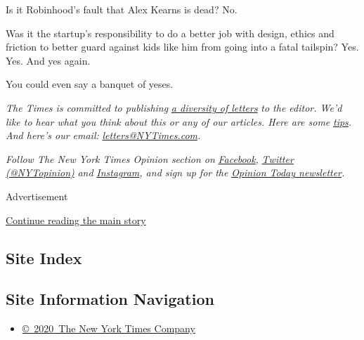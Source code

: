 Is it Robinhood's fault that Alex Kearns is dead? No.

Was it the startup's responsibility to do a better job with design,
ethics and friction to better guard against kids like him from going
into a fatal tailspin? Yes. Yes. And yes again.

You could even say a banquet of yeses.

\emph{The Times is committed to publishing}
\href{https://www.nytimes3xbfgragh.onion/2019/01/31/opinion/letters/letters-to-editor-new-york-times-women.html}{\emph{a
diversity of letters}} \emph{to the editor. We'd like to hear what you
think about this or any of our articles. Here are some}
\href{https://help.nytimes3xbfgragh.onion/hc/en-us/articles/115014925288-How-to-submit-a-letter-to-the-editor}{\emph{tips}}\emph{.
And here's our email:}
\href{mailto:letters@NYTimes.com}{\emph{letters@NYTimes.com}}\emph{.}

\emph{Follow The New York Times Opinion section on}
\href{https://www.facebookcorewwwi.onion/nytopinion}{\emph{Facebook}}\emph{,}
\href{http://twitter.com/NYTOpinion}{\emph{Twitter (@NYTopinion)}}
\emph{and}
\href{https://www.instagram.com/nytopinion/}{\emph{Instagram}}\emph{,
and sign up for the}
\href{http://www.nytimes3xbfgragh.onion/newsletters/opiniontoday/}{\emph{Opinion
Today newsletter}}\emph{.}

Advertisement

\protect\hyperlink{after-bottom}{Continue reading the main story}

\hypertarget{site-index}{%
\subsection{Site Index}\label{site-index}}

\hypertarget{site-information-navigation}{%
\subsection{Site Information
Navigation}\label{site-information-navigation}}

\begin{itemize}
\tightlist
\item
  \href{https://help.nytimes3xbfgragh.onion/hc/en-us/articles/115014792127-Copyright-notice}{©~2020~The
  New York Times Company}
\end{itemize}

